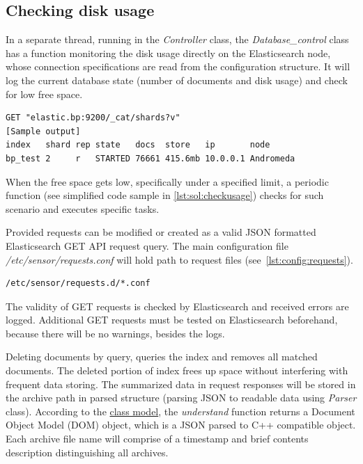 \documentclass[12pt,a4paper,twoside]{report}
\begin{document}
		\subsection{Checking disk usage} \label{implementation:sensor:disk}		
			In a separate thread, running in the \emph{Controller} class, the \emph{Database\_control} class has a function monitoring the disk usage directly on the Elasticsearch node, whose connection specifications are read from the configuration structure. It will log the current database state (number of documents and disk usage) and check for low free space.
			\begin{lstlisting}[language=Clean, caption=Get number of documents and disk usage, label=lst:apicall:diskusage]
GET "elastic.bp:9200/_cat/shards?v"
[Sample output]
index   shard rep state   docs  store   ip       node
bp_test 2     r   STARTED 76661 415.6mb 10.0.0.1 Andromeda
			\end{lstlisting}				
			When the free space gets low, specifically under a specified limit, a periodic function (see simplified code sample in \autoref{lst:sol:checkusage}) checks for such scenario and executes specific tasks.
			
			Provided requests can be modified or created as a valid JSON formatted Elasticsearch GET API request query. The main configuration file \emph{/etc/sensor/requests.conf} will hold path to request files (see~\autoref{lst:config:requests}). 
			\begin{lstlisting}[language=bash, style=appendix, caption=Contents of main requests configuration file, label=lst:config:requests]
/etc/sensor/requests.d/*.conf
			\end{lstlisting}				
			The validity of GET requests is checked by Elasticsearch and received errors are logged. Additional GET requests must be tested on Elasticsearch beforehand, because there will be no warnings, besides the logs.\par
			Deleting documents by query, queries the index and removes all matched documents. The deleted portion of index frees up space without interfering with frequent data storing. The summarized data in request responses will be stored in the archive path in parsed structure (parsing JSON to readable data using \emph{Parser} class). According to the \hyperref[figure:sol:datamodel]{class model}, the \emph{understand} function returns a Document Object Model (DOM) object, which is a JSON parsed to C++ compatible object. Each archive file name will comprise of a timestamp and brief contents description distinguishing all archives.
			
\end{document}

